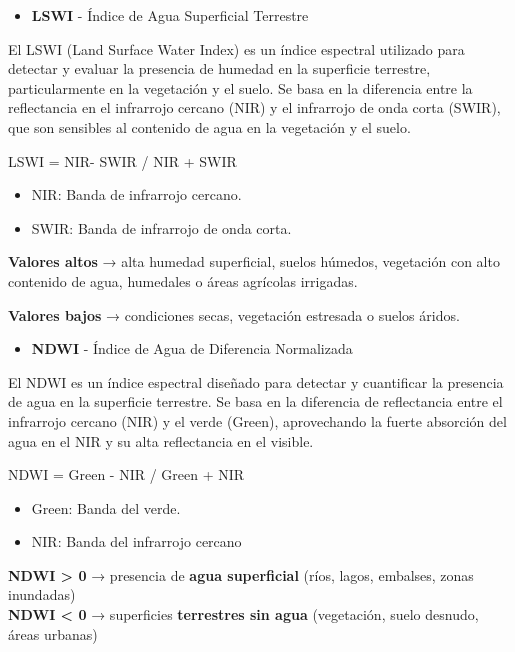 \documentclass[
]{book}
\providecommand{\tightlist}{%
  \setlength{\itemsep}{0pt}\setlength{\parskip}{0pt}}
\begin{document}
\begin{itemize}
\tightlist
\item
  \textbf{LSWI} - Índice de Agua Superficial Terrestre
\end{itemize}

El LSWI (Land Surface Water Index) es un índice espectral utilizado para detectar y evaluar la presencia de humedad en la superficie terrestre, particularmente en la vegetación y el suelo. Se basa en la diferencia entre la reflectancia en el infrarrojo cercano (NIR) y el infrarrojo de onda corta (SWIR), que son sensibles al contenido de agua en la vegetación y el suelo.

LSWI = NIR- SWIR / NIR + SWIR\hspace{0pt}

\begin{itemize}
\item
  NIR: Banda de infrarrojo cercano.
\item
  SWIR: Banda de infrarrojo de onda corta.
\end{itemize}

\textbf{Valores altos} → alta humedad superficial, suelos húmedos, vegetación con alto contenido de agua, humedales o áreas agrícolas irrigadas.

\textbf{Valores bajos} → condiciones secas, vegetación estresada o suelos áridos.

\begin{itemize}
\tightlist
\item
  \textbf{NDWI} - Índice de Agua de Diferencia Normalizada
\end{itemize}

El NDWI es un índice espectral diseñado para detectar y cuantificar la presencia de agua en la superficie terrestre. Se basa en la diferencia de reflectancia entre el infrarrojo cercano (NIR) y el verde (Green), aprovechando la fuerte absorción del agua en el NIR y su alta reflectancia en el visible.

NDWI = Green - NIR / Green + NIR\hspace{0pt}

\begin{itemize}
\tightlist
\item
  Green: Banda del verde.\\
\item
  NIR: Banda del infrarrojo cercano
\end{itemize}

\textbf{NDWI \textgreater{} 0} → presencia de \textbf{agua superficial} (ríos, lagos, embalses, zonas inundadas)\\
\textbf{NDWI \textless{} 0} → superficies \textbf{terrestres sin agua} (vegetación, suelo desnudo, áreas urbanas)
\end{document}
